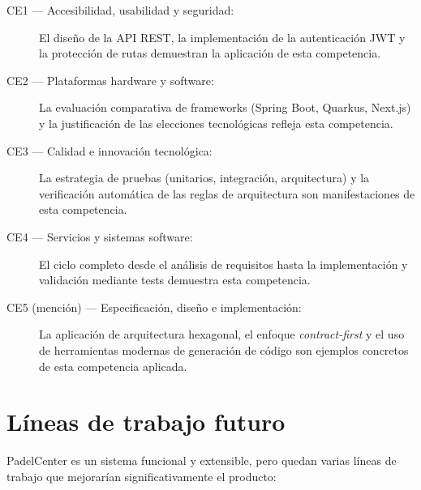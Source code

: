 \begin{description}
  \item[CE1 — Accesibilidad, usabilidad y seguridad:]\leavevmode
    El diseño de la API REST, la implementación de la autenticación JWT y la
    protección de rutas demuestran la aplicación de esta competencia.

  \item[CE2 — Plataformas hardware y software:]\leavevmode
    La evaluación comparativa de frameworks (Spring Boot, Quarkus, Next.js) y
    la justificación de las elecciones tecnológicas refleja esta competencia.

  \item[CE3 — Calidad e innovación tecnológica:]\leavevmode
    La estrategia de pruebas (unitarios, integración, arquitectura) y la
    verificación automática de las reglas de arquitectura son manifestaciones
    de esta competencia.

  \item[CE4 — Servicios y sistemas software:]\leavevmode
    El ciclo completo desde el análisis de requisitos hasta la implementación
    y validación mediante tests demuestra esta competencia.

  \item[CE5 (mención) — Especificación, diseño e implementación:]\leavevmode
    La aplicación de arquitectura hexagonal, el enfoque \textit{contract-first}
    y el uso de herramientas modernas de generación de código son ejemplos
    concretos de esta competencia aplicada.
\end{description}

\section{Líneas de trabajo futuro}
\label{sec:lineas_futuras}

PadelCenter es un sistema funcional y extensible, pero quedan varias líneas de
trabajo que mejorarían significativamente el producto:

